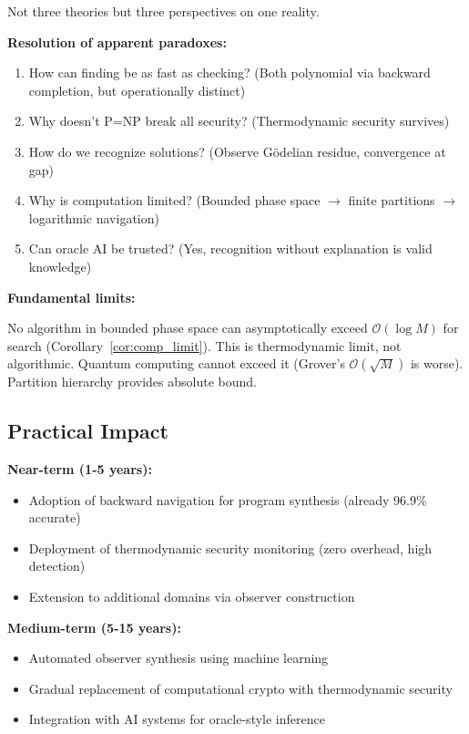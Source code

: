 \documentclass[twocolumn,10pt]{article}
\theoremstyle{definition}
\theoremstyle{remark}
\newcommand{\bigO}{\mathcal{O}}
\begin{document}
Not three theories but three perspectives on one reality.

\vspace{0.2cm}
\noindent\textbf{Resolution of apparent paradoxes:}
\begin{enumerate}
\item How can finding be as fast as checking? (Both polynomial via backward completion, but operationally distinct)
\item Why doesn't P=NP break all security? (Thermodynamic security survives)
\item How do we recognize solutions? (Observe Gödelian residue, convergence at gap)
\item Why is computation limited? (Bounded phase space $\to$ finite partitions $\to$ logarithmic navigation)
\item Can oracle AI be trusted? (Yes, recognition without explanation is valid knowledge)
\end{enumerate}

\vspace{0.2cm}
\noindent\textbf{Fundamental limits:}

No algorithm in bounded phase space can asymptotically exceed $\bigO(\log M)$ for search (Corollary~\ref{cor:comp_limit}). This is thermodynamic limit, not algorithmic. Quantum computing cannot exceed it (Grover's $\bigO(\sqrt{M})$ is worse). Partition hierarchy provides absolute bound.

\subsection{Practical Impact}

\textbf{Near-term (1-5 years):}
\begin{itemize}
\item Adoption of backward navigation for program synthesis (already 96.9\% accurate)
\item Deployment of thermodynamic security monitoring (zero overhead, high detection)
\item Extension to additional domains via observer construction
\end{itemize}

\textbf{Medium-term (5-15 years):}
\begin{itemize}
\item Automated observer synthesis using machine learning
\item Gradual replacement of computational crypto with thermodynamic security
\item Integration with AI systems for oracle-style inference
\end{itemize}
\end{document}
